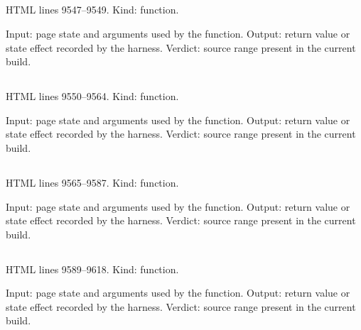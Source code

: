 \subsection*{\texttt{}}
\label{vf_526_reviewEventsWithoutIntegrity}
HTML lines 9547--9549. Kind: function.

Input: page state and arguments used by the function.
Output: return value or state effect recorded by the harness.
Verdict: source range present in the current build.

\subsection*{\texttt{}}
\label{vf_527_integrityMismatches}
HTML lines 9550--9564. Kind: function.

Input: page state and arguments used by the function.
Output: return value or state effect recorded by the harness.
Verdict: source range present in the current build.

\subsection*{\texttt{}}
\label{vf_528_renderIntegrity}
HTML lines 9565--9587. Kind: function.

Input: page state and arguments used by the function.
Output: return value or state effect recorded by the harness.
Verdict: source range present in the current build.

\subsection*{\texttt{}}
\label{vf_529_renderReviewOverview}
HTML lines 9589--9618. Kind: function.

Input: page state and arguments used by the function.
Output: return value or state effect recorded by the harness.
Verdict: source range present in the current build.

